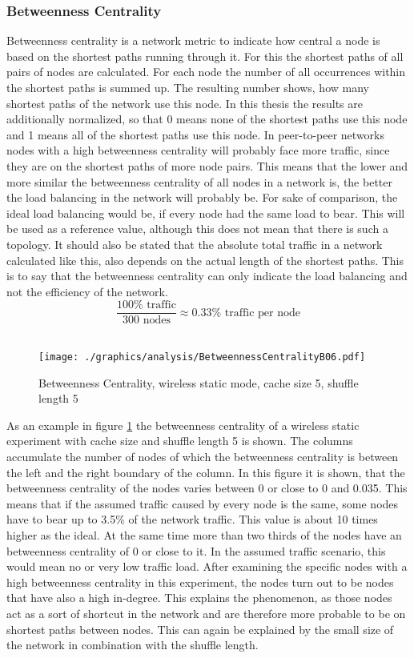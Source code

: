 \subsubsection{Betweenness Centrality}
Betweenness centrality is a network metric to indicate how central a node is
based on the shortest paths running through it. For this the shortest paths of
all pairs of nodes are calculated. For each node the number of all occurrences
within the shortest paths is summed up. The resulting number shows, how many
shortest paths of the network use this node. In this thesis the results are
additionally normalized, so that 0 means none of the shortest paths use this
node and 1 means all of the shortest paths use this node. In peer-to-peer
networks nodes with a high betweenness centrality will probably face more
traffic, since they are on the shortest paths of more node pairs. This means
that the lower and more similar the betweenness centrality of all nodes in a network
is, the better the load balancing in the network will probably be. For sake of
comparison, the ideal load balancing would be, if every node had the same load
to bear. This will be used as a reference value, although this does not mean
that there is such a topology. It should also be stated that the absolute total
traffic in a network calculated like this, also depends on the actual length of
the shortest paths. This is to say that the betweenness centrality can only
indicate the load balancing and not the efficiency of the network. \[\frac{100\%
\text{ traffic}}{300 \text{ nodes}} \approx 0.33\% \text{ traffic per node}\]\\

\begin{figure}
	\texttt{[image: ./graphics/analysis/BetweennessCentralityB06.pdf]}
	\caption{Betweenness Centrality, wireless static mode, cache size 5, shuffle
	length 5}
	\label{fig:betweennessB06}
\end{figure}

As an example in figure \ref{fig:betweennessB06} the betweenness centrality of a
wireless static experiment with cache size and shuffle length 5 is shown. The
columns accumulate the number of nodes of which the betweenness centrality is
between the left and the right boundary of the column. In this figure it is
shown, that the betweenness centrality of the nodes varies between 0 or close to
0 and 0.035. This means that if the assumed traffic caused by every node is the
same, some nodes have to bear up to 3.5\% of the network traffic. This value is
about 10 times higher as the ideal. At the same time more than two thirds of
the nodes have an betweenness centrality of 0 or close to it. In the assumed
traffic scenario, this would mean no or very low traffic load. After examining
the specific nodes with a high betweenness centrality in this experiment, the
nodes turn out to be nodes that have also a high in-degree.
This explains the phenomenon, as those nodes act as a sort of shortcut in the
network and are therefore more probable to be on shortest paths between nodes.
This can again be explained by the small size of the network in combination with
the shuffle length.

